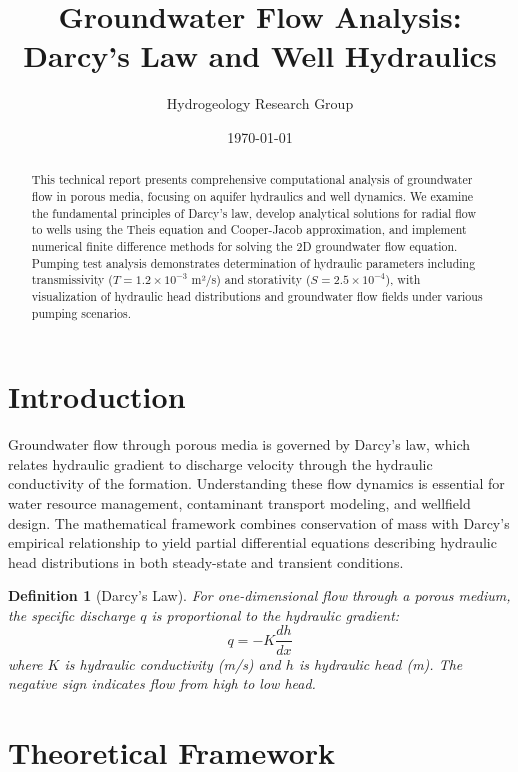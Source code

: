 \documentclass[a4paper, 11pt]{article}
\title{Groundwater Flow Analysis: Darcy's Law and Well Hydraulics}
\author{Hydrogeology Research Group}
\date{\today}
\newtheorem{definition}{Definition}[section]
\begin{document}
\maketitle

\begin{abstract}
This technical report presents comprehensive computational analysis of groundwater flow in
porous media, focusing on aquifer hydraulics and well dynamics. We examine the fundamental
principles of Darcy's law, develop analytical solutions for radial flow to wells using the
Theis equation and Cooper-Jacob approximation, and implement numerical finite difference
methods for solving the 2D groundwater flow equation. Pumping test analysis demonstrates
determination of hydraulic parameters including transmissivity ($T = 1.2 \times 10^{-3}$ m²/s)
and storativity ($S = 2.5 \times 10^{-4}$), with visualization of hydraulic head distributions
and groundwater flow fields under various pumping scenarios.
\end{abstract}

\section{Introduction}

Groundwater flow through porous media is governed by Darcy's law, which relates hydraulic
gradient to discharge velocity through the hydraulic conductivity of the formation. Understanding
these flow dynamics is essential for water resource management, contaminant transport modeling,
and wellfield design. The mathematical framework combines conservation of mass with Darcy's
empirical relationship to yield partial differential equations describing hydraulic head
distributions in both steady-state and transient conditions.

\begin{definition}[Darcy's Law]
For one-dimensional flow through a porous medium, the specific discharge $q$ is proportional
to the hydraulic gradient:
\begin{equation}
q = -K \frac{dh}{dx}
\end{equation}
where $K$ is hydraulic conductivity (m/s) and $h$ is hydraulic head (m). The negative sign
indicates flow from high to low head.
\end{definition}

\section{Theoretical Framework}
\end{document}
